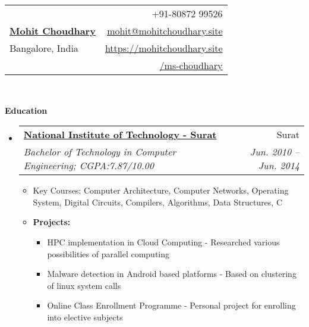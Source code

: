 \documentclass[letterpaper,11pt]{article}
\makeatletter
\newcommand{\resitem}[1]{\item #1 \vspace{-2pt}}
\newcommand{\resheading}[1]{{\large \colorbox{mygrey}{\begin{minipage}{\textwidth}{\textbf{#1 \vphantom{p\^{E}}}}\end{minipage}}}}
\newcommand{\ressubheading}[4]{
\begin{tabular*}{6.5in}{l@{\extracolsep{\fill}}r}
		\textbf{#1} & #2 \\
		\textit{#3} & \textit{#4} \\
\end{tabular*}\vspace{-6pt}}
\makeatother
\begin{document}
\newcommand{\mywebheader}{
\begin{tabular*}{7in}{l@{\extracolsep{\fill}}r}
                & +91-80872 99526\\
	\textbf{\href{https://mohitchoudhary.site/}{\LARGE Mohit Choudhary}} & \href{mailto:mohit@mohitchoudhary.site}{mohit@mohitchoudhary.site}\\
	{Bangalore, India} & \href{https://mohitchoudhary.site}{https://mohitchoudhary.site} \\
                & \faGithub \href{https://github.com/ms-choudhary}{/ms-choudhary} \\
	\end{tabular*}
\\
\vspace{0.1in}}

\mywebheader

\resheading{Education}
	\begin{itemize}
		\item
			\ressubheading{\href{http://www.svnit.ac.in/}{National Institute of Technology - Surat}}{Surat}{{Bachelor of Technology in Computer Engineering}; {CGPA:7.87/10.00}}{Jun. 2010 -- Jun. 2014}
				{ \footnotesize
				\begin{itemize}
					\resitem{Key Courses: Computer Architecture, Computer Networks, Operating System, Digital Circuits, Compilers, Algorithms, Data Structures, C}
					\resitem{\textbf{{Projects:}}} 
						\begin{itemize}
							\resitem{HPC implementation in Cloud Computing - Researched various possibilities of parallel computing}
							\resitem{Malware detection in Android based platforms - Based on clustering of linux system calls}
							\resitem{Online Class Enrollment Programme - Personal project for enrolling into elective subjects }
						\end{itemize}
				\end{itemize}
				}
	\end{itemize} %
\end{document}
